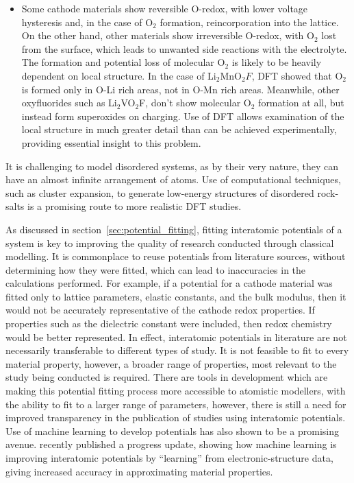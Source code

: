 \documentclass[../main.tex]{subfiles}
\begin{document}
\begin{itemize}
    \item Some cathode materials show reversible O-redox, with lower voltage hysteresis and, in the case of O$_2$ formation, reincorporation into the lattice.\cite{Sharpe2020} On the other hand, other materials show irreversible O-redox, with O$_2$ lost from the surface, which leads to unwanted side reactions with the electrolyte.\cite{Nakayama2020, Chen2016, House2020a} The formation and potential loss of molecular O$_2$ is likely to be heavily dependent on local structure. In the case of Li$_2$MnO$_2F$, DFT showed that O$_2$ is formed only in O-Li rich areas, not in O-Mn rich areas.\cite{Sharpe2020} Meanwhile, other oxyfluorides such as Li$_2$VO$_2$F, don’t show molecular O$_2$ formation at all, but instead form superoxides on charging.\cite{Chang2020} Use of DFT allows examination of the local structure in much greater detail than can be achieved experimentally, providing essential insight to this problem.
\end{itemize}

It is challenging to model disordered systems, as by their very nature, they can have an almost infinite arrangement of atoms. Use of computational techniques, such as cluster expansion, to generate low-energy structures of disordered rock-salts is a promising route to more realistic DFT studies.\cite{Lun2020}

As discussed in section~\ref{sec:potential_fitting}, fitting interatomic potentials of a system is key to improving the quality of research conducted through classical modelling. It is commonplace to reuse potentials from literature sources, without determining how they were fitted, which can lead to inaccuracies in the calculations performed. For example, if a potential for a cathode material was fitted only to lattice parameters, elastic constants, and the bulk modulus, then it would not be accurately representative of the cathode redox properties. If properties such as the dielectric constant were included, then redox chemistry would be better represented. In effect, interatomic potentials in literature are not necessarily transferable to different types of study. It is not feasible to fit to every material property, however, a broader range of properties, most relevant to the study being conducted is required. There are tools in development \cite{gale_empirical_1996,Stukowski_2017,wen_kim-compliant_2017, Morgan2020BuckFit} which are making this potential fitting process more accessible to atomistic modellers, with the ability to fit to a larger range of parameters, however, there is still a need for improved transparency in the publication of studies using interatomic potentials. Use of machine learning to develop potentials has also shown to be a promising avenue. \citeauthor{deringer2019machine} recently published a progress update, showing how machine learning is improving interatomic potentials by ``learning'' from electronic-structure data, giving increased accuracy in approximating material properties. \cite{deringer2019machine}
\end{document}
